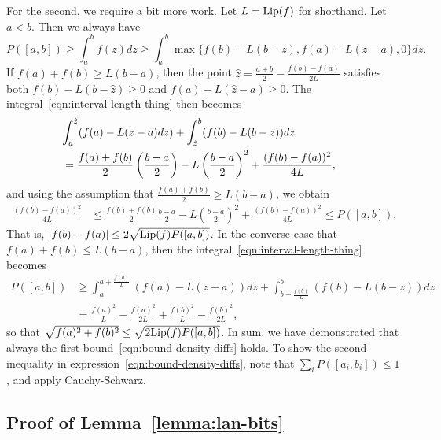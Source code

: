 For the second, we require a bit more work.
Let $L = {\rm \textup{Lip}}(f)$ for shorthand. Let $a < b$.
Then we always have
\begin{equation}
  \label{eqn:interval-length-thing}
  P([a, b])
  \ge \int_a^b f(z) dz
  \ge \int_a^b \max\{f(b) - L (b - z), f(a) - L(z - a), 0\} dz.
\end{equation}
If $f(a) + f(b) \ge L (b - a)$, then the point $\hat{z} =
\frac{a + b}{2} - \frac{f(b) - f(a)}{2L}$ satisfies both $f(b) - L(b -
\hat{z}) \ge 0$ and $f(a) - L(\hat{z} - a) \ge 0$. The
integral~\eqref{eqn:interval-length-thing} then becomes
\begin{align*}
  \lefteqn{\int_a^{\hat{z}}
    (f(a) - L (z - a) dz)
    + \int_{\hat{z}}^b
    (f(b) - L (b - z)) dz} \\
  & = \frac{f(a) + f(b)}{2}
  \left(\frac{b - a}{2}\right)
  - L \left(\frac{b - a}{2} \right)^2
  + \frac{(f(b) - f(a))^2}{4L},
\end{align*}
and using the assumption that $\frac{f(a) + f(b)}{2} \ge L(b - a)$,
we obtain
\begin{align*}
  \frac{(f(b) - f(a))^2}{4L}
  & \le \frac{f(b) + f(b)}{2} \frac{b - a}{2}
  - L \left(\frac{b - a}{2}\right)^2
  + \frac{(f(b) - f(a))^2}{4L}
  \le P([a, b]).
\end{align*}
That is, $|f(b) - f(a)| \le 2 \sqrt{{\rm \textup{Lip}}(f) P([a, b])}$.
In the converse case that $f(a) + f(b) \le L(b - a)$, then
the integral~\eqref{eqn:interval-length-thing} becomes
\begin{align*}
  P([a, b])
  & \ge \int_a^{a + \frac{f(a)}{L}}
  (f(a) - L (z - a)) dz
  + \int_{b - \frac{f(b)}{L}}^b (f(b) - L (b - z)) dz \\
  & = \frac{f(a)^2}{L}
  - \frac{f(a)^2}{2L}
  + \frac{f(b)^2}{L}
  - \frac{f(b)^2}{2L},
\end{align*}
so that $\sqrt{f(a)^2 + f(b)^2} \le \sqrt{2 {\rm \textup{Lip}}(f) P([a, b])}$.  In sum,
we have demonstrated that always the first
bound~\eqref{eqn:bound-density-diffs} holds.
To show the second inequality in expression~\eqref{eqn:bound-density-diffs},
note that
$\sum_i P([a_i, b_i]) \le 1$, and apply Cauchy-Schwarz.

\subsection{Proof of Lemma~\ref{lemma:lan-bits}}
\label{sec:proof-lan-bits}

